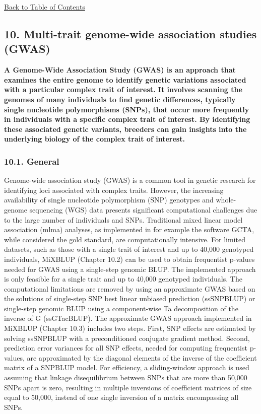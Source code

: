 \hyperref[Tabl01]{Back to Table of Contents}

\newpage

\subsection{10. Multi-trait genome-wide association studies
(GWAS)}\label{MTGW01}

\textbf{A Genome-Wide Association Study (GWAS) is an approach that
examines the entire genome to identify genetic variations associated
with a particular complex trait of interest. It involves scanning the
genomes of many individuals to find genetic differences, typically
single nucleotide polymorphisms (SNPs), that occur more frequently in
individuals with a specific complex trait of interest. By identifying
these associated genetic variants, breeders can gain insights into the
underlying biology of the complex trait of interest.}

\subsubsection{10.1. General}\label{MTGW02}

Genome-wide association study (GWAS) is a common tool in genetic
research for identifying loci associated with complex traits. However,
the increasing availability of single nucleotide polymorphism (SNP)
genotypes and whole-genome sequencing (WGS) data presents significant
computational challenges due to the large number of individuals and
SNPs. Traditional mixed linear model association (mlma) analyses, as
implemented in for example the software GCTA, while considered the gold
standard, are computationally intensive. For limited datasets, such as
those with a single trait of interest and up to 40,000 genotyped
individuals, MiXBLUP (Chapter 10.2) can be used to obtain frequentist
p-values needed for GWAS using a single-step genomic BLUP. The
implemented approach is only feasible for a single trait and up to
40,000 genotyped individuals. The computational limitations are removed
by using an approximate GWAS based on the solutions of single-step SNP
best linear unbiased prediction (ssSNPBLUP) or single-step genomic BLUP
using a component-wise Ta decomposition of the inverse of G
(ssGTacBLUP). The approximate GWAS approach implemented in MiXBLUP
(Chapter 10.3) includes two steps. First, SNP effects are estimated by
solving ssSNPBLUP with a preconditioned conjugate gradient method.
Second, prediction error variances for all SNP effects, needed for
computing frequentist p-values, are approximated by the diagonal
elements of the inverse of the coefficient matrix of a SNPBLUP model.
For efficiency, a sliding-window approach is used assuming that linkage
disequilibrium between SNPs that are more than 50,000 SNPs apart is
zero, resulting in multiple inversions of coefficient matrices of size
equal to 50,000, instead of one single inversion of a matrix
encompassing all SNPs.


